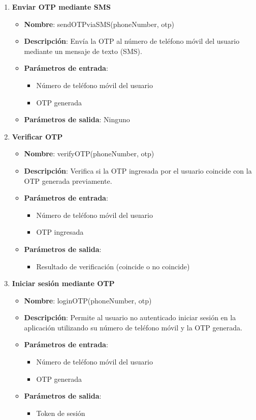 \begin{enumerate}[label=SOP-\protect\twodigits{\arabic*}:, align=left, leftmargin=*]
\item \textbf{Enviar OTP mediante SMS}
\begin{itemize}
\item \textbf{Nombre}: sendOTPviaSMS(phoneNumber, otp)
\item \textbf{Descripción}: Envía la OTP al número de teléfono móvil del usuario mediante un mensaje de texto (SMS).
\item \textbf{Parámetros de entrada}:
\begin{itemize}
\item Número de teléfono móvil del usuario
\item OTP generada
\end{itemize}
\item \textbf{Parámetros de salida}: Ninguno
\end{itemize}

\item \textbf{Verificar OTP}
\begin{itemize}
\item \textbf{Nombre}: verifyOTP(phoneNumber, otp)
\item \textbf{Descripción}: Verifica si la OTP ingresada por el usuario coincide con la OTP generada previamente.
\item \textbf{Parámetros de entrada}:
\begin{itemize}
\item Número de teléfono móvil del usuario
\item OTP ingresada
\end{itemize}
\item \textbf{Parámetros de salida}:
\begin{itemize}
\item Resultado de verificación (coincide o no coincide)
\end{itemize}
\end{itemize}

\item \textbf{Iniciar sesión mediante OTP}
\begin{itemize}
\item \textbf{Nombre}: loginOTP(phoneNumber, otp)
\item \textbf{Descripción}: Permite al usuario no autenticado iniciar sesión en la aplicación utilizando su número de teléfono móvil y la OTP generada.
\item \textbf{Parámetros de entrada}:
\begin{itemize}
\item Número de teléfono móvil del usuario
\item OTP generada
\end{itemize}
\item \textbf{Parámetros de salida}:
\begin{itemize}
\item Token de sesión
\end{itemize}
\end{itemize}


\end{enumerate}
